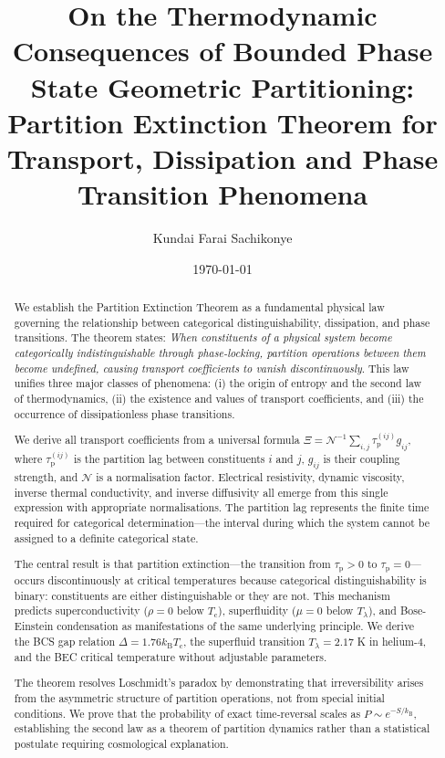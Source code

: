 \documentclass[twocolumn,10pt,aps,prd,superscriptaddress,nofootinbib]{revtex4-2}
\theoremstyle{remark}
\newcommand{\kB}{k_{\mathrm{B}}}
\newcommand{\tauP}{\tau_{\mathrm{p}}}
\newcommand{\Tcrit}{T_{\mathrm{c}}}
\newcommand{\Gij}{g_{ij}}
\newcommand{\Norm}{\mathcal{N}}
\newcommand{\Transp}{\Xi}
\begin{document}
\title{On the Thermodynamic Consequences of Bounded Phase State Geometric Partitioning: Partition Extinction Theorem for Transport, Dissipation and Phase Transition Phenomena}

\author{Kundai Farai Sachikonye}

\date{\today}

\begin{abstract}
We establish the Partition Extinction Theorem as a fundamental physical law governing the relationship between categorical distinguishability, dissipation, and phase transitions. The theorem states: \emph{When constituents of a physical system become categorically indistinguishable through phase-locking, partition operations between them become undefined, causing transport coefficients to vanish discontinuously}. This law unifies three major classes of phenomena: (i) the origin of entropy and the second law of thermodynamics, (ii) the existence and values of transport coefficients, and (iii) the occurrence of dissipationless phase transitions.

We derive all transport coefficients from a universal formula $\Transp = \Norm^{-1} \sum_{i,j} \tauP^{(ij)} \Gij$, where $\tauP^{(ij)}$ is the partition lag between constituents $i$ and $j$, $\Gij$ is their coupling strength, and $\Norm$ is a normalisation factor. Electrical resistivity, dynamic viscosity, inverse thermal conductivity, and inverse diffusivity all emerge from this single expression with appropriate normalisations. The partition lag represents the finite time required for categorical determination---the interval during which the system cannot be assigned to a definite categorical state.

The central result is that partition extinction---the transition from $\tauP > 0$ to $\tauP = 0$---occurs discontinuously at critical temperatures because categorical distinguishability is binary: constituents are either distinguishable or they are not. This mechanism predicts superconductivity ($\rho = 0$ below $\Tcrit$), superfluidity ($\mu = 0$ below $T_\lambda$), and Bose-Einstein condensation as manifestations of the same underlying principle. We derive the BCS gap relation $\Delta = 1.76 \kB \Tcrit$, the superfluid transition $T_\lambda = 2.17$ K in helium-4, and the BEC critical temperature without adjustable parameters.

The theorem resolves Loschmidt's paradox by demonstrating that irreversibility arises from the asymmetric structure of partition operations, not from special initial conditions. We prove that the probability of exact time-reversal scales as $P \sim e^{-S/\kB}$, establishing the second law as a theorem of partition dynamics rather than a statistical postulate requiring cosmological explanation.


\end{abstract}
\end{document}
